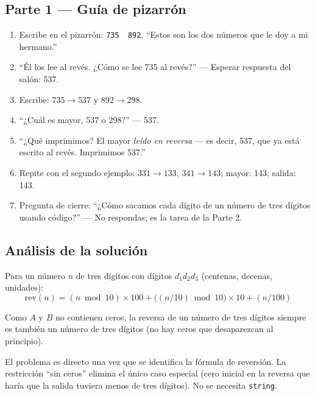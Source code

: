 \documentclass[12pt, oneside]{article}
\begin{document}
\subsection{Parte 1 — Guía de pizarrón}

\begin{notaprofesor}
  \begin{enumerate}
    \item Escribe en el pizarrón: \texttt{735\ \ 892}.
          ``Estos son los dos números que le doy a mi hermano.''
    \item ``Él los lee al revés.  ¿Cómo se lee 735 al revés?''
          — Esperar respuesta del salón: 537.
    \item Escribe: $735 \to 537$ y $892 \to 298$.
    \item ``¿Cuál es mayor, 537 o 298?''  — 537.
    \item ``¿Qué imprimimos?  El mayor \emph{leído en reversa} —
          es decir, 537, que ya está escrito al revés.  Imprimimos 537.''
    \item Repite con el segundo ejemplo: $331 \to 133$, $341 \to 143$;
          mayor: 143; salida: 143.
    \item Pregunta de cierre: ``¿Cómo sacamos cada dígito de un número
          de tres dígitos usando código?''
           — No respondas; es la tarea de la Parte 2.
  \end{enumerate}
\end{notaprofesor}

\subsection{Análisis de la solución}

Para un número $n$ de tres dígitos con dígitos $d_1 d_2 d_3$ (centenas,
decenas, unidades):
\[
  \text{rev}(n) = (n \bmod 10) \times 100
               + \bigl((n / 10) \bmod 10\bigr) \times 10
               + (n / 100)
\]

Como $A$ y $B$ no contienen ceros, la reversa de un número de tres dígitos
siempre es también un número de tres dígitos (no hay ceros que desaparezcan
al principio).

\begin{notaprofesor}
  El problema es directo una vez que se identifica la fórmula de reversión.
  La restricción ``sin ceros'' elimina el único caso especial (cero inicial
  en la reversa que haría que la salida tuviera menos de tres dígitos).
  No se necesita \texttt{string}.
\end{notaprofesor}
\end{document}
